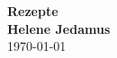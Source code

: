 

\begin{titlepage}
  \vspace*{10cm}
  \begin{center}
    {\Huge\bfseries Rezepte} \\
    {\sf\Huge\bfseries Helene Jedamus} \\
    \today{}
  \end{center}
\end{titlepage}
\cleardoublepage

